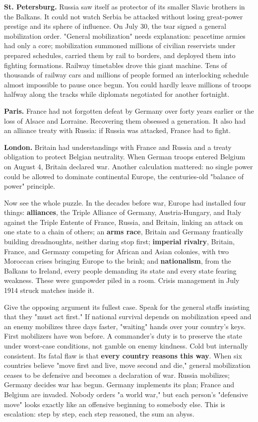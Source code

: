 \textbf{St. Petersburg.} Russia saw itself as protector of its smaller Slavic brothers in the Balkans. It could not watch Serbia be attacked without losing great-power prestige and its sphere of influence. On July 30, the tsar signed a general mobilization order. "General mobilization" needs explanation: peacetime armies had only a core; mobilization summoned millions of civilian reservists under prepared schedules, carried them by rail to borders, and deployed them into fighting formations. Railway timetables drove this giant machine. Tens of thousands of railway cars and millions of people formed an interlocking schedule almost impossible to pause once begun. You could hardly leave millions of troops halfway along the tracks while diplomats negotiated for another fortnight.

\textbf{Paris.} France had not forgotten defeat by Germany over forty years earlier or the loss of Alsace and Lorraine. Recovering them obsessed a generation. It also had an alliance treaty with Russia: if Russia was attacked, France had to fight.

\textbf{London.} Britain had understandings with France and Russia and a treaty obligation to protect Belgian neutrality. When German troops entered Belgium on August 4, Britain declared war. Another calculation mattered: no single power could be allowed to dominate continental Europe, the centuries-old "balance of power" principle.

Now see the whole puzzle. In the decades before war, Europe had installed four things: \textbf{alliances}, the Triple Alliance of Germany, Austria-Hungary, and Italy against the Triple Entente of France, Russia, and Britain, linking an attack on one state to a chain of others; an \textbf{arms race}, Britain and Germany frantically building dreadnoughts, neither daring stop first; \textbf{imperial rivalry}, Britain, France, and Germany competing for African and Asian colonies, with two Moroccan crises bringing Europe to the brink; and \textbf{nationalism}, from the Balkans to Ireland, every people demanding its state and every state fearing weakness. These were gunpowder piled in a room. Crisis management in July 1914 struck matches inside it.

Give the opposing argument its fullest case. Speak for the general staffs insisting that they "must act first." If national survival depends on mobilization speed and an enemy mobilizes three days faster, "waiting" hands over your country's keys. First mobilizers have won before. A commander's duty is to preserve the state under worst-case conditions, not gamble on enemy kindness. Cold but internally consistent. Its fatal flaw is that \textbf{every country reasons this way}. When six countries believe "move first and live, move second and die," general mobilization ceases to be defensive and becomes a declaration of war. Russia mobilizes; Germany decides war has begun. Germany implements its plan; France and Belgium are invaded. Nobody orders "a world war," but each person's "defensive move" looks exactly like an offensive beginning to somebody else. This is escalation: step by step, each step reasoned, the sum an abyss.

